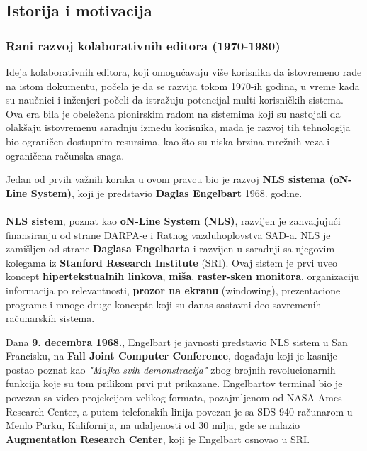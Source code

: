 \documentclass[12pt]{article}
\begin{document}
\subsection{Istorija i motivacija}
   

\subsubsection{Rani razvoj kolaborativnih editora (1970-1980)}

Ideja kolaborativnih editora, koji omogućavaju više korisnika da istovremeno rade na istom dokumentu, počela je da se razvija tokom 1970-ih godina, u vreme kada su naučnici i inženjeri počeli da istražuju potencijal multi-korisničkih sistema. Ova era bila je obeležena pionirskim radom na sistemima koji su nastojali da olakšaju istovremenu saradnju između korisnika, mada je razvoj tih tehnologija bio ograničen dostupnim resursima, kao što su niska brzina mrežnih veza i ograničena računska snaga.
    
Jedan od prvih važnih koraka u ovom pravcu bio je razvoj \textbf{NLS sistema (oN-Line System)}, koji je predstavio \textbf{Daglas Engelbart} 1968. godine.

\paragraph{}
\textbf{NLS sistem}, poznat kao \textbf{oN-Line System (NLS)}, razvijen je zahvaljujući finansiranju od strane DARPA-e i Ratnog vazduhoplovstva SAD-a. NLS je zamišljen od strane \textbf{Daglasa Engelbarta} i razvijen u saradnji sa njegovim kolegama iz \textbf{Stanford Research Institute} (SRI). Ovaj sistem je prvi uveo koncept \textbf{hipertekstualnih linkova}, \textbf{miša}, \textbf{raster-sken monitora}, organizaciju informacija po relevantnosti, \textbf{prozor na ekranu} (windowing), prezentacione programe i mnoge druge koncepte koji su danas sastavni deo savremenih računarskih sistema.
    
Dana \textbf{9. decembra 1968.}, Engelbart je javnosti predstavio NLS sistem u San Francisku, na \textbf{Fall Joint Computer Conference}, događaju koji je kasnije postao poznat kao \textit{"Majka svih demonstracija"} zbog brojnih revolucionarnih funkcija koje su tom prilikom prvi put prikazane. Engelbartov terminal bio je povezan sa video projekcijom velikog formata, pozajmljenom od NASA Ames Research Center, a putem telefonskih linija povezan je sa SDS 940 računarom u Menlo Parku, Kalifornija, na udaljenosti od 30 milja, gde se nalazio \textbf{Augmentation Research Center}, koji je Engelbart osnovao u SRI.
    
\end{document}
